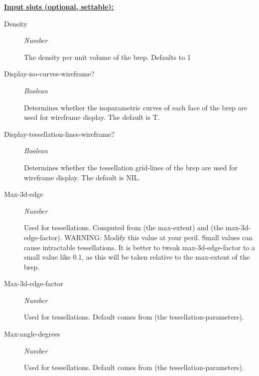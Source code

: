 \documentclass [11pt]{book}
\begin{document}
\begin{itemize}
\begin{description}
\texttt{}



\end{description}






\textbf{
\underline{Input slots (optional, settable):}}

\begin{description}

\item [Density]
\emph{Number}

 The density per unit volume of the brep. Defaults to 1




\item [Display-iso-curves-wireframe?]
\emph{Boolean}

 Determines whether the isoparametric curves of each face of the brep are used for wireframe display.
The default is T.




\item [Display-tessellation-lines-wireframe?]
\emph{Boolean}

 Determines whether the tessellation grid-lines of the brep are used for wireframe display.
The default is NIL.




\item [Max-3d-edge]
\emph{Number}

 Used for tessellations. Computed from (the max-extent) and (the max-3d-edge-factor).
WARNING: Modify this value at your peril. Small values can cause intractable tessellations.
It is better to tweak max-3d-edge-factor to a small value like 0.1, as this will
be taken relative to the max-extent of the brep.




\item [Max-3d-edge-factor]
\emph{Number}

 Used for tessellations. Default comes from (the tessellation-parameters).




\item [Max-angle-degrees]
\emph{Number}

 Used for tessellations. Default comes from (the tessellation-parameters).





\end{description}
\end{itemize}
\end{document}
